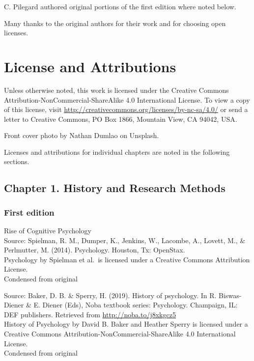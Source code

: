 \documentclass[
]{krantz}
\begin{document}
C. Pilegard authored original portions of the first edition where noted below.

Many thanks to the original authors for their work and for choosing open licenses.

\section*{License and Attributions}\label{license-and-attributions}


Unless otherwise noted, this work is licensed under the Creative Commons Attribution-NonCommercial-ShareAlike 4.0 International License. To view a copy of this license, visit \url{http://creativecommons.org/licenses/by-nc-sa/4.0/} or send a letter to Creative Commons, PO Box 1866, Mountain View, CA 94042, USA.

Front cover photo by Nathan Dumlao on Unsplash.

Licenses and attributions for individual chapters are noted in the following sections.

\subsection*{Chapter 1. History and Research Methods}\label{chapter-1.-history-and-research-methods}


\subsubsection*{First edition}\label{first-edition-1}


Rise of Cognitive Psychology\\
Source: Spielman, R. M., Dumper, K., Jenkins, W., Lacombe, A., Lovett, M., \& Perlmutter, M. (2014). Psychology. Houston, Tx: OpenStax.\\
Psychology by Spielman et al.~is licensed under a Creative Commons Attribution License.\\
Condensed from original

Source: Baker, D. B. \& Sperry, H. (2019). History of psychology. In R. Biswas-Diener \& E. Diener (Eds), Noba textbook series: Psychology. Champaign, IL: DEF publishers. Retrieved from \url{http://noba.to/j8xkgcz5}\\
History of Psychology by David B. Baker and Heather Sperry is licensed under a Creative Commons Attribution-NonCommercial-ShareAlike 4.0 International License.\\
Condensed from original
\end{document}
